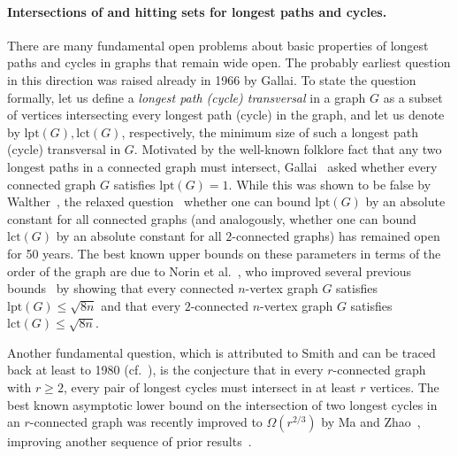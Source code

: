 \documentclass[11pt,reqno]{article}
\begin{document}
\paragraph*{\textbf{Intersections of and hitting sets for longest paths and cycles.}} There are many fundamental open problems about basic properties of longest paths and cycles in graphs that remain wide open. The probably earliest question in this direction was raised already in 1966 by Gallai. To state the question formally, let us define a \emph{longest path (cycle) transversal} in a graph $G$ as a subset of vertices intersecting every longest path (cycle) in the graph, and let us denote by $\mathrm{lpt}(G), \mathrm{lct}(G)$, respectively, the minimum size of such a longest path (cycle) transversal in $G$. Motivated by the well-known folklore fact that any two longest paths in a connected graph must intersect, Gallai~\cite{gallai} asked whether every connected graph $G$ satisfies $\mathrm{lpt}(G)=1$. While this was shown to be false by Walther~\cite{walther}, the relaxed question~\cite{Zam76,Wal78} whether one can bound $\mathrm{lpt}(G)$ by an absolute constant for all connected graphs (and analogously, whether one can bound $\mathrm{lct}(G)$ by an absolute constant for all 
$2$-connected graphs) has remained open for 50 years. The best known upper bounds on these parameters in terms of the order of the graph are due to Norin et al.~\cite{norin}, who improved several previous bounds~\cite{Rau14,Lon21,Kie23} by showing that every connected $n$-vertex graph $G$ satisfies $\mathrm{lpt}(G)\le \sqrt{8n}$ and that every $2$-connected $n$-vertex graph $G$ satisfies $\mathrm{lct}(G)\le \sqrt{8n}$. 

Another fundamental question, which is attributed to Smith and can be traced back at least to 1980 (cf.~\cite{Groetschel84,Bondy95}), is the conjecture that in every $r$-connected graph with $r\ge 2$, every pair of longest cycles must intersect in at least $r$ vertices. The best known asymptotic lower bound on the intersection of two longest cycles in an $r$-connected graph was recently improved to $\Omega(r^{2/3})$ by Ma and Zhao~\cite{ma2025intersections}, improving another sequence of prior results~\cite{groen,Chen}.
\end{document}
